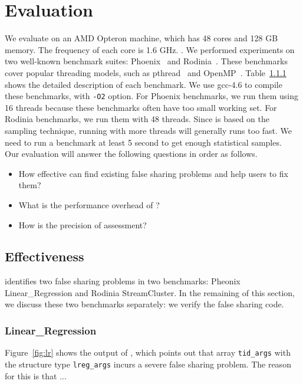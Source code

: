 \section{Evaluation}
\label{sec:eval}

We evaluate \cheetah{} on an AMD Opteron machine, which has 48 cores and 128 GB memory. The frequency of each core is 1.6 GHz. \todo{} . We performed experiments on two well-known benchmark suites: Phoenix~\cite{} and Rodinia~\cite{}. These benchmarks cover popular threading models, such as pthread~\cite{} and OpenMP~\cite{}. Table~\ref{} shows the detailed description of each benchmark. We use gcc-4.6 to compile these benchmarks, with {\tt -O2} option. For Phoenix benchmarks, we run them using 16 threads because these benchmarks often have too small working set. For Rodinia benchmarks, we run them with 48 threads. Since \cheetah{} is based on the sampling technique, running with more threads will generally runs too fast. We need to run a benchmark at least 5 second to get enough statistical samples. \\

\sloppy{}
Our evaluation will answer the following questions in order as follows. 

\begin{itemize}
\item How effective can \cheetah{} find existing false sharing problems and help users to fix them? 

\item What is the performance overhead of \cheetah{}? 

\item How is the precision of assessment? 

\end{itemize}

\subsection{Effectiveness}

\cheetah{} identifies two false sharing problems in two benchmarks: Pheonix Linear\_Regression and Rodinia StreamCluster. In the remaining of this section, we discuss these two benchmarks separately: we verify the false sharing code. 

\subsubsection{Linear\_Regression}
Figure~\ref{fig:lr} shows the output of \cheetah{}, which points out that array {\tt tid\_args} with the structure type {\tt lreg\_args} incurs a severe false sharing problem. The reason for this is that ...

